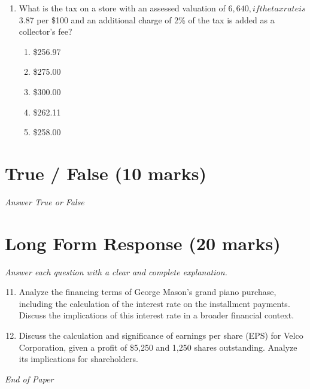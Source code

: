 \documentclass[12pt]{article}
\begin{document}
\begin{enumerate}[label=\arabic*.]
\begin{enumerate}[label=(\alph*)]
    \item \$190.20
    \item \$152.35
    \item \$198.75
    \item \$174.23
    \item \$210.00
\end{enumerate}
\item What is the tax on a store with an assessed valuation of $6,640, if the tax rate is $3.87 per \$100 and an additional charge of 2\% of the tax is added as a collector's fee?
\begin{enumerate}[label=(\alph*)]
    \item \$256.97
    \item \$275.00
    \item \$300.00
    \item \$262.11
    \item \$258.00
\end{enumerate}
\end{enumerate}

\section*{True / False (10 marks)}
\textit{Answer True or False}

\section*{Long Form Response (20 marks)}
\textit{Answer each question with a clear and complete explanation.}
\begin{enumerate}[label=\arabic*.]
\setcounter{enumi}{10}
\item Analyze the financing terms of George Mason's grand piano purchase, including the calculation of the interest rate on the installment payments. Discuss the implications of this interest rate in a broader financial context.
\item Discuss the calculation and significance of earnings per share (EPS) for Velco Corporation, given a profit of \$5,250 and 1,250 shares outstanding. Analyze its implications for shareholders.
\end{enumerate}

\vfill
\noindent\textit{End of Paper}
\end{document}
